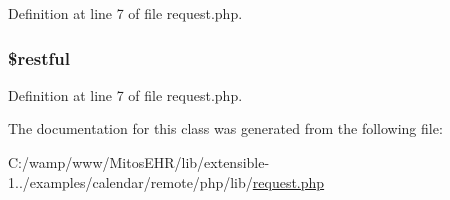 \-Definition at line 7 of file request.\-php.

\hypertarget{class_request_a9e55885b258b0f5bc40d258e52f41741}{
\subsubsection[{\$restful}]{\setlength{\rightskip}{0pt plus 5cm}\$restful}}\label{class_request_a9e55885b258b0f5bc40d258e52f41741}


\-Definition at line 7 of file request.\-php.



\-The documentation for this class was generated from the following file\-:\begin{DoxyCompactItemize}
\item 
\-C\-:/wamp/www/\-Mitos\-E\-H\-R/lib/extensible-\/1../examples/calendar/remote/php/lib/\hyperlink{request_8php}{request.\-php}\end{DoxyCompactItemize}
